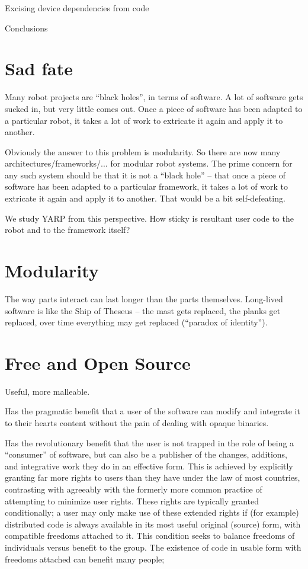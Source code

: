 Excising device dependencies from code

Conclusions


\section{Sad fate}

Many robot projects are ``black holes'', in terms of software.  A lot
of software gets sucked in, but very little comes out.  Once a piece
of software has been adapted to a particular robot, it takes a lot
of work to extricate it again and apply it to another.

Obviously the answer to this problem is modularity.  So there are 
now many architectures/frameworks/... for modular robot systems.
The prime concern for any such system should be that it is not
a ``black hole'' -- that once a piece of software has been adapted
to a particular framework, it takes a lot of work to extricate it
again and apply it to another.  That would be a bit self-defeating.

We study YARP from this perspective.  How sticky is resultant user
code to the robot and to the framework itself?

\section{Modularity}

The way parts interact can last longer than the parts themselves.
Long-lived software is like the Ship of Theseus -- the mast gets replaced,
the planks get replaced, over time everything may get replaced (``paradox
of identity'').


\section{Free and Open Source}

Useful, more malleable.

Has the pragmatic benefit that a user of the software can
modify and integrate it to their hearts content without the 
pain of dealing with opaque binaries.

Has the revolutionary benefit that the user is not trapped in the role
of being a ``consumer'' of software, but can also be a publisher of
the changes, additions, and integrative work they do in an effective
form.  This is achieved by explicitly granting far more rights to
users than they have under the law of most countries, contrasting with
agreeably with the formerly more common practice of attempting to
minimize user rights.  These rights are typically granted
conditionally; a user may only make use of these extended rights if
(for example) distributed code is always available in its most useful
original (source) form, with compatible freedoms attached to it.  This
condition seeks to balance freedoms of individuals versus benefit to
the group.  The existence of code in usable form with freedoms 
attached can benefit many people;

